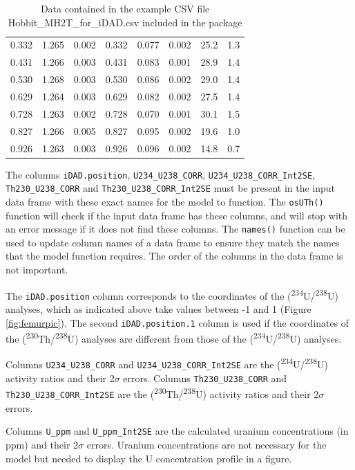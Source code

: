 \documentclass[]{elsarticle} %
\begin{document}
\begin{table}[ht]
\begin{tabular}{cccccccc}
  0.332 & 1.265 & 0.002 & 0.332 & 0.077 & 0.002 & 25.2 & 1.3 \\ 
  0.431 & 1.266 & 0.003 & 0.431 & 0.083 & 0.001 & 28.9 & 1.4 \\ 
  0.530 & 1.268 & 0.003 & 0.530 & 0.086 & 0.002 & 29.0 & 1.4 \\ 
  0.629 & 1.264 & 0.003 & 0.629 & 0.082 & 0.002 & 27.5 & 1.4 \\ 
  0.728 & 1.263 & 0.002 & 0.728 & 0.070 & 0.001 & 30.1 & 1.5 \\ 
  0.827 & 1.266 & 0.005 & 0.827 & 0.095 & 0.002 & 19.6 & 1.0 \\ 
  0.926 & 1.263 & 0.003 & 0.926 & 0.096 & 0.002 & 14.8 & 0.7 \\ 
   \hline
\end{tabular}
\caption{\label{tab:hobbitone}Data contained in the example CSV file Hobbit\_MH2T\_for\_iDAD.csv included in the package} 
\end{table}

The columns \texttt{iDAD.position}, \texttt{U234\_U238\_CORR}, \texttt{U234\_U238\_CORR\_Int2SE}, \texttt{Th230\_U238\_CORR} and \texttt{Th230\_U238\_CORR\_Int2SE} must be present in the input data frame with these exact names for the model to function. The \texttt{osUTh()} function will check if the input data frame has these columns, and will stop with an error message if it does not find these columns. The \texttt{names()} function can be used to update column names of a data frame to ensure they match the names that the model function requires. The order of the columns in the data frame is not important.

The \texttt{iDAD.position} column corresponds to the coordinates of the (\textsuperscript{234}U/\textsuperscript{238}U) analyses, which as indicated above take values between -1 and 1 (Figure \ref{fig:femurpic}). The second \texttt{iDAD.position.1} column is used if the coordinates of the (\textsuperscript{230}Th/\textsuperscript{238}U) analyses are different from those of the (\textsuperscript{234}U/\textsuperscript{238}U) analyses.

Columns \texttt{U234\_U238\_CORR} and \texttt{U234\_U238\_CORR\_Int2SE} are the (\textsuperscript{234}U/\textsuperscript{238}U) activity ratios and their 2\(\sigma\) errors. Columns \texttt{Th230\_U238\_CORR} and
\texttt{Th230\_U238\_CORR\_Int2SE} are the (\textsuperscript{230}Th/\textsuperscript{238}U) activity ratios and their 2\(\sigma\) errors.

Columns \texttt{U\_ppm} and \texttt{U\_ppm\_Int2SE} are the calculated uranium concentrations (in ppm) and their 2\(\sigma\) errors. Uranium concentrations are not necessary for the model but needed to display the U concentration profile in a figure.
\end{document}
